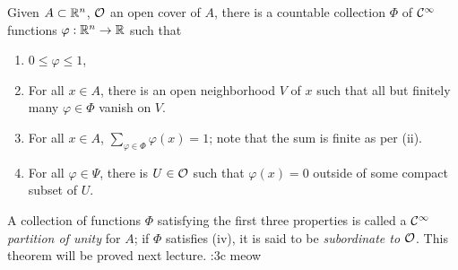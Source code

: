 \begin{simplethm}
    Given $A \subset \mathbb R^n$, $\mathcal O$ an open cover of $A$, there is a countable collection $\Phi$ of $\mathcal C^\infty$ functions $\varphi : \mathbb R^n \to \mathbb R$ such that
    \begin{enumerate}[label=(\roman*)]
        \item $0 \leq \varphi \leq 1$,
        \item For all $x \in A$, there is an open neighborhood $V$ of $x$ such that all but finitely many $\varphi \in \Phi$ vanish on $V$.
        \item For all $x \in A$, $\sum_{\varphi \in \Phi} \varphi(x) = 1$; note that the sum is finite as per (ii).
        \item For all $\varphi \in \Psi$, there is $U \in \mathcal O$ such that $\varphi(x) = 0$ outside of some compact subset of $U$.
    \end{enumerate}
\end{simplethm}
\noindent A collection of functions $\Phi$ satisfying the first three properties is called a $\mathcal C^\infty$ \textit{partition of unity} for $A$; if $\Phi$ satisfies (iv), it is said to be \textit{subordinate to $\mathcal O$}. This theorem will be proved next lecture. :3c meow